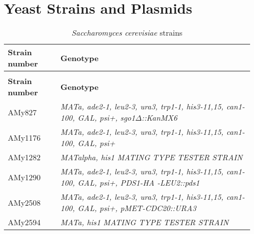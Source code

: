 \chapter{Yeast Strains and Plasmids}
\label{append:strainsplasmids}

\begin{longtable}{p{}p{}}
\caption{\textit{Saccharomyces cerevisiae} strains}
\label{tab:cerevisiaetable}\\
\hline
\textbf{Strain number} & \textbf{Genotype}
\\
\hline                 
\endfirsthead
\caption{\textit{Saccharomyces cerevisiae} strains}\\
\hline
\textbf{Strain number} & \textbf{Genotype}
\\
\hline 
\endhead
\hline
\endfoot
AMy827          & \textit{MATa, ade2-1, leu2-3, ura3,   trp1-1, his3-11,15, can1-100, GAL, psi+, sgo1$\Delta$::KanMX6}                                                                                                                                                          \\
AMy1176         & \textit{MATa, ade2-1, leu2-3, ura3,   trp1-1, his3-11,15, can1-100, GAL, psi+}                                                                                                                                                                         \\
AMy1282         & \textit{MATalpha, his1 MATING TYPE   TESTER STRAIN}                                                                                                                                                                                                    \\
AMy1290         & \textit{MATa, ade2-1, leu2-3, ura3,   trp1-1, his3-11,15, can1-100, GAL, psi+, PDS1-HA -LEU2::pds1}                                                                                                                                                    \\
AMy2508         & \textit{MATa, ade2-1, leu2-3, ura3,   trp1-1, his3-11,15, can1-100, GAL, psi+, pMET-CDC20::URA3}                                                                                                                                                       \\
AMy2594         & \textit{MATa, his1 MATING TYPE TESTER   STRAIN}                                                                                                                                                                                                        \\

\end{longtable}
